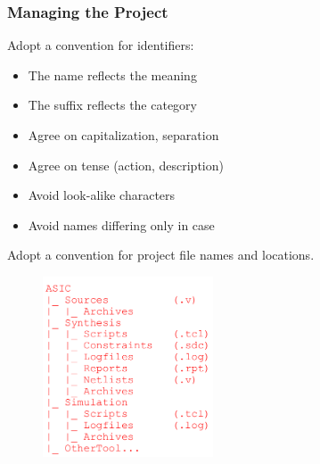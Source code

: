 \documentclass[t, notes, xcolor=table]{beamer}
\begin{document}
\begin{frame}
\frametitle{Managing the Project}
\scriptsize{
\begin{multicols}{2}
Adopt a convention for identifiers:
\begin{itemize}
\item The name reflects the meaning
\item The suffix reflects the category
\item Agree on capitalization, separation
\item Agree on tense (action, description)
\item Avoid look-alike characters
\item Avoid names differing only in case
\end{itemize}
\vfill
\columnbreak
Adopt a convention for project file names and locations.
\vfill
\begin{figure}
    \includegraphics[width=0.45\textwidth]{img/16_project_template.png}
\end{figure}
\end{multicols}
}
\end{frame}
\end{document}
